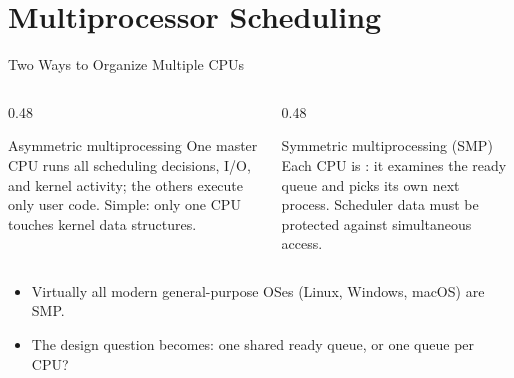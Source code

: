 \documentclass[aspectratio=169]{beamer}
\begin{document}

\section{Multiprocessor Scheduling}

\begin{frame}{Two Ways to Organize Multiple CPUs}
  \begin{columns}[T]
    \begin{column}{0.48\textwidth}
      \begin{block}{Asymmetric multiprocessing}
        One master CPU runs all scheduling decisions, I/O, and kernel
        activity; the others execute only user code.
        Simple: only one CPU touches kernel data structures.
      \end{block}
    \end{column}
    \begin{column}{0.48\textwidth}
      \begin{block}{Symmetric multiprocessing (SMP)}
        Each CPU is : it examines the ready queue and
        picks its own next process. Scheduler data must be protected
        against simultaneous access.
      \end{block}
    \end{column}
  \end{columns}
  \vspace{0.3cm}
  \begin{itemize}
    \item Virtually all modern general-purpose OSes (Linux, Windows, macOS)
      are SMP.
    \item The design question becomes: one shared ready queue, or one queue
      per CPU?
  \end{itemize}
\end{frame}
\end{document}
